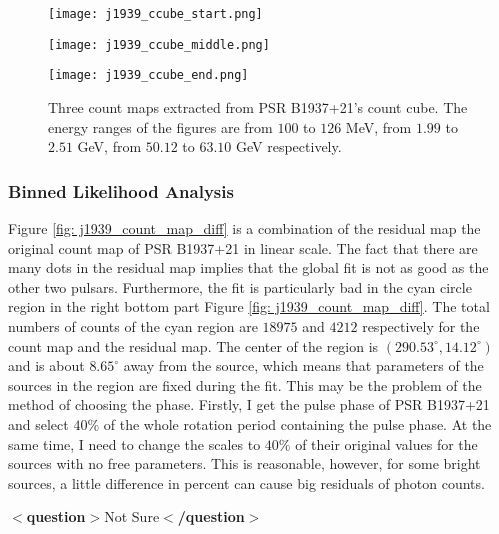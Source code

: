 \documentclass[12pt]{report}
\newcommand{\question}[1]{
  $<$\textbf{question}$>$#1$<$\textbf{/question}$>$
}
\begin{document}
        \begin{figure}[!htp]
          \begin{minipage}{0.32\textwidth}
            \begin{center} 
              \texttt{[image: j1939\_ccube\_start.png]}
            \end{center}
          \end{minipage}
          \begin{minipage}{0.32\textwidth}
            \begin{center}
              \texttt{[image: j1939\_ccube\_middle.png]}
            \end{center}
          \end{minipage}
          \begin{minipage}{0.32\textwidth}
            \begin{center}
            \texttt{[image: j1939\_ccube\_end.png]}
            \end{center}
          \end{minipage}
          \caption{Three count maps extracted from PSR B1937+21's count cube. The energy ranges 
            of the figures are from $100$ to $126$ MeV, from $1.99$ to $2.51$ GeV, from $50.12$ 
            to $63.10$ GeV respectively.}
          \label{fig: j1939_count_cube}
        \end{figure}

      \subsubsection{Binned Likelihood Analysis}
        Figure \ref{fig: j1939_count_map_diff} is a combination of the residual map the 
        original count map of PSR B1937+21 in linear scale. The fact that there are many 
        dots in the residual map implies that the global fit is not as good as the 
        other two pulsars. Furthermore, the fit is particularly bad in the cyan circle 
        region in the right bottom part Figure \ref{fig: j1939_count_map_diff}. 
        The total numbers of counts of the cyan region are $18975$ and $4212$ respectively 
        for the count map and the residual map. The center of the region is 
        $\left(290.53^{\circ}, 14.12^{\circ}\right)$ and is about $8.65^{\circ}$ away from 
        the source, which means that parameters of the sources in the region are fixed 
        during the fit. This may be the problem of the method of choosing the phase. 
        Firstly, I get the pulse phase of PSR B1937+21 and select $40\%$ of the whole 
        rotation period containing the pulse phase. At the same time, I need to change the 
        scales to $40\%$ of their original values for the sources with no free 
        parameters. This is reasonable, however, for some bright sources, a little 
        difference in percent can cause big residuals of photon counts. 
        \question{Not Sure}
\end{document}
